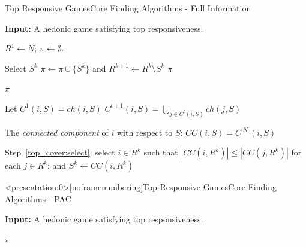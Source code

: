 \documentclass[xcolor=dvipsnames]{beamer}
\newcommand{\ch}{\mathit{ch}}
\newcommand{\CC}{\mathit{CC}}
\begin{document}
\begin{frame}{Top Responsive Games}{Core Finding Algorithms - Full Information}
  \begin{algorithm}[H]
    \small
    \caption{Top Covering Algorithm}
    \label{alg:top_covering}
    \textbf{Input:} A hedonic game satisfying top responsiveness.

    \begin{algorithmic}[1]
    \State $R^1 \leftarrow N$; $\pi \leftarrow \emptyset$.

      \State \label{top_cover:select} Select $S^k$
      \State \label{top_cover:remove} $\pi \leftarrow \pi \cup \lbrace S^k \rbrace$ and $R^{k+1} \leftarrow  R^k \setminus S^k$
        \State \Return $\pi$
      \EndIf
    \EndFor

    \State \Return $\pi$
   \end{algorithmic}
  \end{algorithm}

  \small
  Let $C^1(i, S) = \ch(i, S)$ 
  $C^{t + 1}(i, S) = \underset{j \in C^t(i, S)}{\bigcup} \ch(j, S)$ 

  The \textit{connected component} of $i$ with respect to $S$: $\CC(i, S) = C^{|N|}(i, S)$

  Step~\ref{top_cover:select}: select $i\in R^k$ such
  that $|\CC(i,R^k)| \leq |\CC(j,R^k)|$ for each $j\in R^k$;
  and $S^k\leftarrow \CC(i,R^k)$
\end{frame}

\begin{frame}<presentation:0>[noframenumbering]{Top Responsive Games}{Core Finding Algorithms - PAC}
  \begin{algorithm}[H]
    \caption{Top Covering Algorithm - PAC}
    \textbf{Input:} A hedonic game satisfying top responsiveness.
    \begin{algorithmic}[1]
    \State \Return $\pi$
   \end{algorithmic}
  \end{algorithm}
\end{frame}
\end{document}
